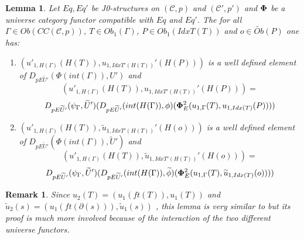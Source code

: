 \documentclass[12pt]{article}
\numberwithin{equation}{section}
\newtheorem{lemma}[proposition]{Lemma}
\newtheorem{remark}[proposition]{Remark}
\newcommand{\llabel}[1]{\label{#1}}
\newcommand{\wt}{\widetilde}
\newcommand{\toCC}{CC} %
\begin{document}
\begin{lemma}
\llabel{2015.05.06.l3} Let $Eq, Eq'$ be J0-structures on $({\mathcal C},p)$ and
$({\mathcal C}',p')$ and $\bf\Phi$ be a universe category functor compatible
with $Eq$ and $Eq'$. The for all $\Gamma\in Ob(\toCC({\mathcal C},p))$, $T\in
Ob_1(\Gamma)$, $P\in Ob_1(IdxT(T))$ and $o\in \wt{Ob}(P)$ one has:
%
\begin{enumerate}
\item $(u'_{1,H(\Gamma)}(H(T)), u_{1,IdxT'(H(T))}'(H(P)))$ is a well defined
  element of $D_{pE\wt{U}'}(\Phi(int(\Gamma)),U')$ and
%
$$(u'_{1,H(\Gamma)}(H(T)),
  u_{1,IdxT'(H(T))}'(H(P)))=$$$$D_{pE\wt{U}'}(\psi_{\Gamma},\wt{U}')(D_{pE\wt{U}'}(int(H(\Gamma)),\phi)({\bf\Phi}_{E}^2(u_{1,\Gamma}(T),u_{1,Idx(T)}(P))))$$
%
\item $(u'_{1,H(\Gamma)}(H(T)), \wt{u}_{1,IdxT'(H(T))}'(H(o)))$ is a well
  defined element of $D_{pE\wt{U}'}(\Phi(int(\Gamma)),\wt{U}')$ and
%
$$(u'_{1,H(\Gamma)}(H(T)),
  \wt{u}_{1,IdxT'(H(T))}'(H(o)))=$$$$D_{pE\wt{U}'}(\psi_{\Gamma},\wt{U}')(D_{pE\wt{U}'}(int(H(\Gamma)),\wt{\phi})({\bf\Phi}_{E}^2(u_{1,\Gamma}(T),\wt{u}_{1,Idx(T)}(o))))$$
%
\end{enumerate}
\end{lemma}
%
\begin{remark}\rm
Since $u_2(T)=(u_1(ft(T)),u_1(T))$ and
$\wt{u}_2(s)=(u_1(ft(\partial(s))),\wt{u}_1(s))$ , this lemma is very similar
to \cite[Lemma 6.1(3,4)]{fromunivwithPi} but its proof is much more involved
because of the interaction of the two different universe functors.
\end{remark}
%
\end{document}

